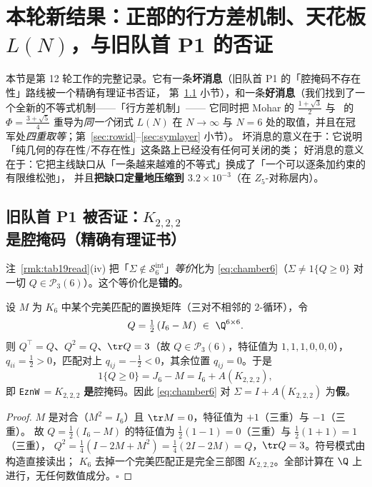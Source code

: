 
\section{本轮新结果：正部的行方差机制、天花板 $L(N)$，与旧队首 P1 的否证}\label{sec:rowvar}

本节是第 12 轮工作的完整记录。它有一条\textbf{坏消息}（旧队首 P1 的「腔掩码不存在性」路线被一个精确有理证书否证，
第~\ref{sec:chamberdead} 小节），和一条\textbf{好消息}（我们找到了一个全新的不等式机制——「行方差机制」——
它同时把 Mohar 的 $\frac{1+\sqrt3}2$ 与 \STW\ 的 $\Phi=\frac{3+\sqrt5}4$ 重导为\emph{同一个}闭式 $L(N)$ 在
$N\to\infty$ 与 $N=6$ 处的取值，并且在冠军处\emph{四重取等}；第~\ref{sec:rowid}--\ref{sec:symlayer} 小节）。
坏消息的意义在于：它说明「纯几何的存在性/不存在性」这条路上已经没有任何可关闭的类；
好消息的意义在于：它把主线缺口从「一条越来越难的不等式」换成了「一个可以逐条加约束的有限维松弛」，
并且\textbf{把缺口定量地压缩到 $3.2\times10^{-3}$}（在 $Z_5$-对称层内）。

\subsection{旧队首 P1 被否证：$K_{2,2,2}$ 是腔掩码（精确有理证书）}\label{sec:chamberdead}

注~\ref{rmk:tab19read}(iv) 把「$\Sigma\notin\mathcal S_6^{\mathrm{int}}$」\emph{等价}化为
\eqref{eq:chamber6}（$\Sigma\ne1\{Q\ge0\}$ 对一切 $Q\in\mathcal P_3(6)$）。这个等价化是\textbf{错的}。

\begin{proposition}\label{prop:chamberdead}
设 $M$ 为 $K_6$ 中某个完美匹配的置换矩阵（三对不相邻的 $2$-循环），令
\[
Q=\tfrac12\,(I_6-M)\ \in\ \Q^{6\times6}.
\]
则 $Q^\top=Q$、$Q^2=Q$、$\tr Q=3$（故 $Q\in\mathcal P_3(6)$，特征值为 $1,1,1,0,0,0$），
$q_{ii}=\frac12>0$，匹配对上 $q_{ij}=-\frac12<0$，其余位置 $q_{ij}=0$。于是
\[
1\{Q\ge0\}=J_6-M=I_6+A(K_{2,2,2}),
\]
即 \texttt{EznW}$\,=K_{2,2,2}$ \textbf{是}腔掩码。因此 \eqref{eq:chamber6} 对 $\Sigma=I+A(K_{2,2,2})$ 为\textbf{假}。
\end{proposition}

\begin{proof}
$M$ 是对合（$M^2=I_6$）且 $\tr M=0$，特征值为 $+1$（三重）与 $-1$（三重）。
故 $Q=\frac12(I_6-M)$ 的特征值为 $\frac12(1-1)=0$（三重）与 $\frac12(1+1)=1$（三重），
$Q^2=\frac14(I-2M+M^2)=\frac14(2I-2M)=Q$，$\tr Q=3$。符号模式由构造直接读出；
$K_6$ 去掉一个完美匹配正是完全三部图 $K_{2,2,2}$。全部计算在 $\Q$ 上进行，无任何数值成分。$\square$
\end{proof}


